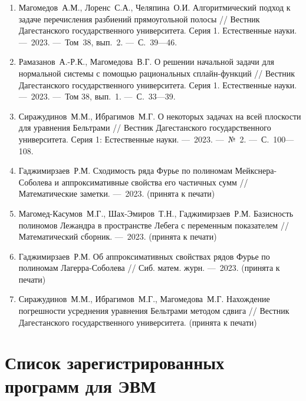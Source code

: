\begin{enumerate}
    \item
    Магомедов~А.М., Лоренс~С.А., Челяпина~О.И.
    Алгоритмический подход к задаче перечисления разбиений прямоугольной полосы 
    // 
    Вестник Дагестанского государственного университета. Серия 1. Естественные науки.
    ---~2023.
    ---~Том~38, вып.~2.
    ---~С.~39---46.

    \item
    Рамазанов~А.-Р.К., Магомедова~В.Г. 
    О решении начальной задачи для нормальной системы с помощью рациональных сплайн-функций
    // 
    Вестник Дагестанского государственного университета. Серия 1. Естественные науки.
    ---~2023.
    ---~Том 38, вып.~1. 
    ---~С.~33---39.

    \item
    Сиражудинов~М.М., Ибрагимов~М.Г. 
    О некоторых задачах на всей плоскости для уравнения Бельтрами 
    // 
    Вестник Дагестанского государственного университета. Серия 1: Естественные науки.
    ---~2023.
    ---~№~2.
    ---~С.~100---108.

    \item
    Гаджимирзаев~Р.М. 
    Сходимость ряда Фурье по полиномам Мейкснера-Соболева и аппроксимативные свойства его частичных сумм 
    // 
    Математические заметки.
    ---~2023. 
    (принята к печати)

    \item
    Магомед-Касумов~М.Г., Шах-Эмиров~Т.Н.,  Гаджимирзаев~Р.М. 
    Базисность полиномов Лежандра в пространстве Лебега с переменным показателем 
    // 
    Математический сборник.
    ---~2023. 
    (принята к печати)

    \item
    Гаджимирзаев~Р.М. 
    Об аппроксимативных свойствах рядов Фурье по полиномам Лагерра-Соболева 
    // 
    Сиб. матем. журн.
    ---~2023. 
    (принята к печати)

    \item
    Сиражудинов~М.М., Ибрагимов~М.Г., Магомедова~М.Г.
    Нахождение погрешности усреднения уравнения Бельтрами методом сдвига 
    // 
    Вестник Дагестанского государственного университета.
    (принята к печати)

\end{enumerate}

\section*{Список зарегистрированных программ для ЭВМ}

